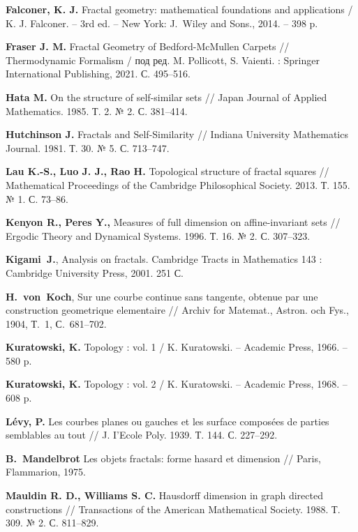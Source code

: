 \begin{thebibliography}{99}
{\bf Falconer, K. J.} 
Fractal geometry: mathematical foundations and applications / 
K. J. Falconer. -- 3rd ed. -- New York: J.~Wiley and Sons., 2014. -- 398 p.

{\bf Fraser J. M. }
Fractal Geometry of Bedford-McMullen Carpets // 
Thermodynamic Formalism / под ред. M. Pollicott, S. Vaienti. : Springer International Publishing, 2021. С. 495--516.

{\bf Hata M. }
On the structure of self-similar sets // 
Japan Journal of Applied Mathematics. 1985. Т. 2. № 2. С. 381–414.

{\bf Hutchinson J. }
Fractals and Self-Similarity // 
Indiana University Mathematics Journal. 1981. Т. 30. № 5. С. 713–747.

{\bf Lau K.-S., Luo J. J., Rao H. }
Topological structure of fractal squares // 
Mathematical Proceedings of the Cambridge Philosophical Society. 2013. Т. 155. № 1. С. 73--86.

{\bf Kenyon R., Peres Y.,} 
Measures of full dimension on affine-invariant sets // 
Ergodic Theory and Dynamical Systems. 1996. Т. 16. № 2. С. 307–323.

{\bf Kigami~J.}, 
Analysis on fractals. Cambridge Tracts in Mathematics 143 : 
Cambridge University Press, 2001. 251 С.


{\bf H.~von~Koch},  
Sur une courbe continue sans tangente, obtenue par
une construction geometrique elementaire // 
Archiv for Matemat., Astron. och Fys., 1904, Т.~1, С.~681--702.

{\bf Kuratowski, K.} 
Topology : vol. 1 / 
K. Kuratowski. -- Academic Press, 1966. -- 580 p.

{\bf Kuratowski, K.} 
Topology : vol. 2 / 
K. Kuratowski. -- Academic Press, 1968. -- 608 p.

{\bf L{\'e}vy, P.} 
Les courbes planes ou gauches et les surface compos{\'e}es de parties semblables au tout // 
J. I’Ecole Poly. 1939. Т. 144. С. 227--292.

{\bf B.~Mandelbrot} 
Les objets fractals: forme hasard et dimension // 
Paris, Flammarion, 1975.

{\bf Mauldin R. D., Williams S. C.}
Hausdorff dimension in graph directed constructions // 
Transactions of the American Mathematical Society. 1988. Т. 309. № 2. С. 811--829.


\end{thebibliography}
